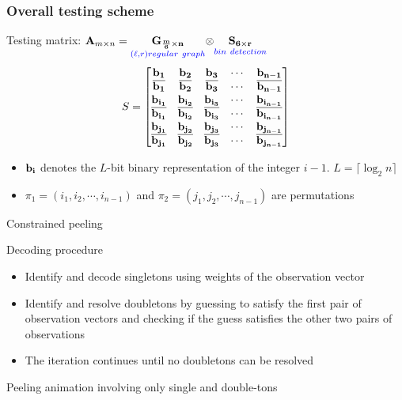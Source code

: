 \begin{frame}\frametitle{Overall testing scheme}
Testing matrix: 
  {\centering
  $\mathbf{A}_{m \times n}  = \underset{\color{blue} (\ell,r) regular~graph}{\bf G_{\frac{m}{6} \times n}} {\Large \bf \otimes} \underset{\color{blue} bin~detection}{\bf S_{6 \times r}}$ \\
  \vspace{6pt}
   {\small 
   \[ S = \begin{bmatrix}
					\bf{b_1} & \bf{b_2} & \bf{b_3} & \cdots & \bf{b_{n-1}}\\
				   	\bf{\overline{b_1}} & \bf{\overline{b_2}} & \bf{\overline{b_3}} & \cdots & \bf{\overline{b_{n-1}}}\\
					\bf{b_{i_1}} & \bf{b_{i_2}} & \bf{b_{i_3}} & \cdots & \bf{b_{i_{n-1}}}\\
				   	\bf{\overline{b_{i_1}}} & \bf{\overline{b_{i_2}}} & \bf{\overline{b_{i_3}}} & \cdots & \bf{\overline{b_{i_{n-1}}}}\\
				   	
					\bf{b_{j_1}} & \bf{b_{j_2}} & \bf{b_{j_3}} & \cdots & \bf{b_{j_{n-1}}}\\
				   	\bf{\overline{b_{j_1}}} & \bf{\overline{b_{j_2}}} & \bf{\overline{b_{j_3}}} & \cdots & \bf{\overline{b_{j_{n-1}}}} \end{bmatrix} 
				   	\]
	}
	}
	\begin{itemize}
	\item $\bf{b_i}$ denotes the $L$-bit binary representation of the integer $i-1$. $L=\lceil \log_2{n} \rceil$
	\item $\pi_1=(i_1, i_2, \cdots, i_{n-1})$ and $\pi_2=(j_1, j_2, \cdots, j_{n-1})$ are permutations 
	\end{itemize}

\end{frame}

\begin{frame}{Constrained peeling}
\begin{block}{Decoding procedure}
\begin{itemize}
\item  Identify and decode singletons using weights of the observation vector
\item Identify and resolve doubletons by guessing to satisfy the first pair of observation vectors and checking if the guess satisfies the other two pairs of observations
\item The iteration continues until no doubletons can be resolved
\end{itemize}
\end{block}
Peeling animation involving only single and double-tons
\end{frame}

